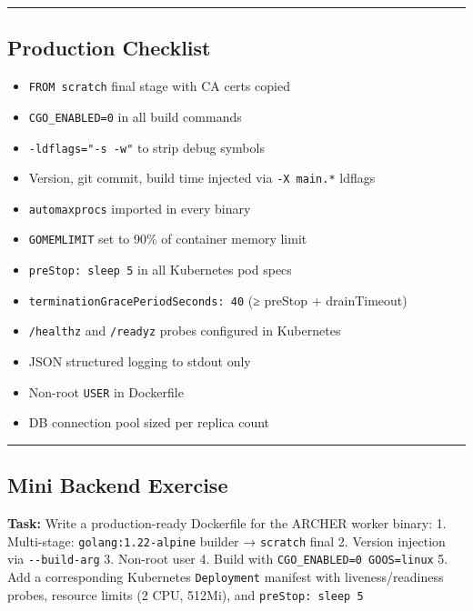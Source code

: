 \documentclass[
]{article}
\providecommand{\tightlist}{%
  \setlength{\itemsep}{0pt}\setlength{\parskip}{0pt}}
\begin{document}
\begin{center}\rule{0.5\linewidth}{0.5pt}\end{center}

\hypertarget{production-checklist-3}{%
\subsection{Production Checklist}\label{production-checklist-3}}

\begin{itemize}
\tightlist
\item[$\square$]
  \texttt{FROM\ scratch} final stage with CA certs copied
\item[$\square$]
  \texttt{CGO\_ENABLED=0} in all build commands
\item[$\square$]
  \texttt{-ldflags="-s\ -w"} to strip debug symbols
\item[$\square$]
  Version, git commit, build time injected via \texttt{-X\ main.*}
  ldflags
\item[$\square$]
  \texttt{automaxprocs} imported in every binary
\item[$\square$]
  \texttt{GOMEMLIMIT} set to 90\% of container memory limit
\item[$\square$]
  \texttt{preStop:\ sleep\ 5} in all Kubernetes pod specs
\item[$\square$]
  \texttt{terminationGracePeriodSeconds:\ 40} (≥ preStop + drainTimeout)
\item[$\square$]
  \texttt{/healthz} and \texttt{/readyz} probes configured in Kubernetes
\item[$\square$]
  JSON structured logging to stdout only
\item[$\square$]
  Non-root \texttt{USER} in Dockerfile
\item[$\square$]
  DB connection pool sized per replica count
\end{itemize}

\begin{center}\rule{0.5\linewidth}{0.5pt}\end{center}

\hypertarget{mini-backend-exercise-2}{%
\subsection{Mini Backend Exercise}\label{mini-backend-exercise-2}}

\textbf{Task:} Write a production-ready Dockerfile for the ARCHER worker
binary: 1. Multi-stage: \texttt{golang:1.22-alpine} builder →
\texttt{scratch} final 2. Version injection via \texttt{-\/-build-arg}
3. Non-root user 4. Build with \texttt{CGO\_ENABLED=0\ GOOS=linux} 5.
Add a corresponding Kubernetes \texttt{Deployment} manifest with
liveness/readiness probes, resource limits (2 CPU, 512Mi), and
\texttt{preStop:\ sleep\ 5}
\end{document}
